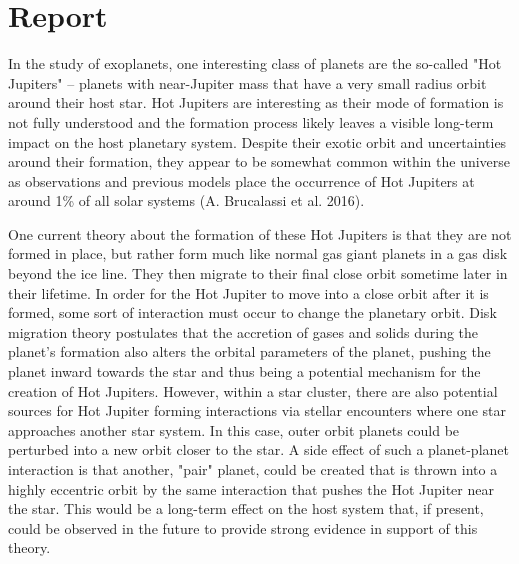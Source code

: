 \documentclass[12pt]{article}
\begin{document}
\section*{Report}

In the study of exoplanets, one interesting class of planets are the so-called "Hot Jupiters" -- planets with near-Jupiter mass that have a 
very small radius orbit around their host star. Hot Jupiters are interesting as their mode of formation is not fully understood and the formation process likely leaves
a visible long-term impact on the host planetary system. 
Despite their exotic orbit and uncertainties around their formation, 
they appear to be somewhat common within the universe as observations and previous models place the occurrence of Hot Jupiters at around 1\% of all solar systems (A. Brucalassi et al. 2016).  

One current theory about the formation of these Hot Jupiters is that they are not formed in place, but rather form much like normal gas giant planets 
in a gas disk beyond the ice line. They then migrate to their final close orbit sometime later in their lifetime. 
In order for the Hot Jupiter to move into a close orbit after it is formed, some sort of interaction must occur to change the planetary orbit. 
Disk migration theory postulates that the accretion of gases and solids during the planet's formation also alters the orbital parameters of the planet,
pushing the planet inward towards the star and thus being a potential mechanism for the creation of Hot Jupiters. However, within a star cluster, 
there are also potential sources for Hot Jupiter forming interactions via stellar encounters where one star approaches another star system. In this
case, outer orbit planets could be perturbed into a new orbit closer to the star. 
A side effect of such a planet-planet interaction is that another, "pair" planet, could be created that is 
thrown into a highly eccentric orbit by the same interaction that pushes the Hot Jupiter near the star. This would be a long-term effect on the host system that, if present, 
could be observed in the future to provide strong evidence in support of this theory. 
\end{document}
